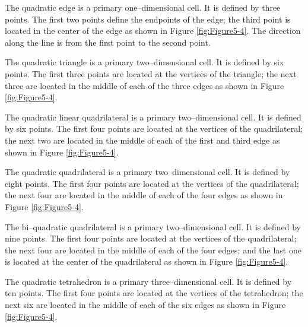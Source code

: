 \begin{description}[leftmargin=0cm,labelindent=0cm]

\item[Quadratic Edge.\index{cell!quadratic edge}] The quadratic edge is a primary one--dimensional cell. It is defined by three points. The first two points define the endpoints of the edge; the third point is located in the center of the edge as shown in Figure \ref{fig:Figure5-4}. The direction along the line is from the first point to the second point.

\item[Quadratic Triangle.\index{cell!quadratic triangle}] The quadratic triangle is a primary two--dimensional cell. It is defined by six points. The first three points are located at the vertices of the triangle; the next three are located in the middle of each of the three edges as shown in Figure \ref{fig:Figure5-4}.

\item[Quadratic Linear Quadrilateral.\index{cell!quadratic linear quadrilateral}] The quadratic linear quadrilateral is a primary two--dimensional cell. It is defined by six points. The first four points are located at the vertices of the quadrilateral; the next two are located in the middle of each of the first and third edge as shown in Figure \ref{fig:Figure5-4}.

\item[Quadratic Quadrilateral.\index{cell!quadratic quadrilateral}] The quadratic quadrilateral is a primary two--dimensional cell. It is defined by eight points. The first four points are located at the vertices of the quadrilateral; the next four are located in the middle of each of the four edges as shown in Figure \ref{fig:Figure5-4}.

\item[Bi--Quadratic Quadrilateral.\index{bi-quadratic quadrilateral}\index{cell!bi-quadratic quadrilateral}] The bi--quadratic quadrilateral is a primary two--dimensional cell. It is defined by nine points. The first four points are located at the vertices of the quadrilateral; the next four are located in the middle of each of the four edges; and the last one is located at the center of the quadrilateral as shown in Figure \ref{fig:Figure5-4}.

\item[Quadratic Tetrahedron.\index{cell!quadratic tetrahedron}] The quadratic tetrahedron is a primary three--dimensional cell. It is defined by ten points. The first four points are located at the vertices of the tetrahedron; the next six are located in the middle of each of the six edges as shown in Figure \ref{fig:Figure5-4}.


\end{description}
